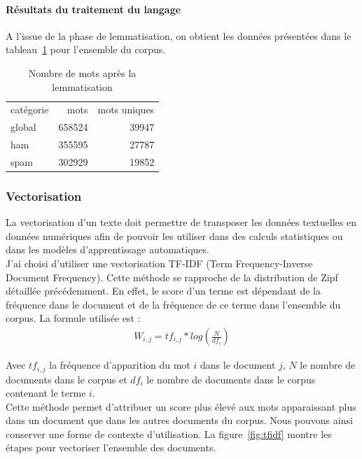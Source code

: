    \paragraph{Résultats du traitement du langage}
        A l'issue de la phase de lemmatisation, on obtient les données présentées dans le tableau~\ref{tab:nlp} pour l'ensemble du corpus.
        \begin{table}[H]
            \centering
            \begin{tabular}{l|rr}
                catégorie & mots & mots uniques \\
                global & 658524 & 39947 \\
                \hline
                ham & 355595 & 27787 \\
                \hline
                spam & 302929 & 19852 \\
            \end{tabular}
            \caption{Nombre de mots après la lemmatisation}
            \label{tab:nlp}
        \end{table}

	\subsubsection{Vectorisation}
	    La vectorisation d'un texte doit permettre de transposer les données textuelles en données numériques afin de
        pouvoir les utiliser dans des calculs statistiques ou dans les modèles d'apprentissage automatiques.\\
		J'ai choisi d'utiliser une vectorisation TF-IDF\cite{ml-python} (Term Frequency-Inverse Document Frequency).
        Cette méthode se rapproche de la distribution de Zipf détaillée précédemment.
        En effet, le score d'un terme est dépendant de la fréquence dans le document et de la fréquence de ce terme dans l'ensemble du corpus.
        La formule utilisée est :
        \begin{align*}
            W_{i,j} = tf_{i,j}*log(\frac{N}{df_{i}})
        \end{align*}

        Avec $tf_{i,j}$ la fréquence d'apparition du mot $i$ dans le document $j$, $N$ le nombre de documents dans le corpus et $df_{i}$ le nombre de documents dans le corpus contenant le terme $i$. \\
        Cette méthode permet d'attribuer un score plus élevé aux mots apparaissant plus dans un document que dans les autres documents du corpus.
        Nous pouvons ainsi conserver une forme de contexte d'utilisation.
        La figure~\ref{fig:tfidf} montre les étapes pour vectoriser l'ensemble des documents.

